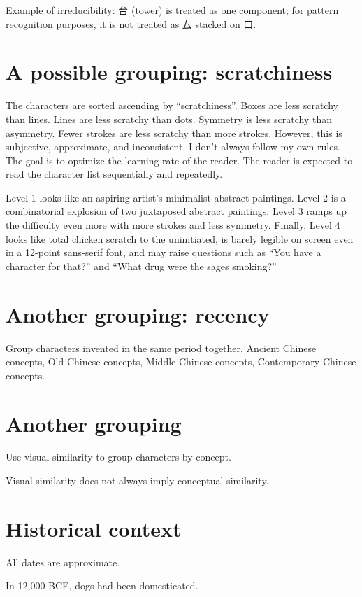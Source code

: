 Example of irreducibility:
台 (tower) is treated as one component;
for pattern recognition purposes,
it is not treated as 厶 stacked on 口.

\section{A possible grouping: scratchiness}

The characters are sorted ascending by ``scratchiness''.
Boxes are less scratchy than lines.
Lines are less scratchy than dots.
Symmetry is less scratchy than asymmetry.
Fewer strokes are less scratchy than more strokes.
However, this is subjective, approximate, and inconsistent.
I don't always follow my own rules.
The goal is to optimize the learning rate of the reader.
The reader is expected to read the character list
sequentially and repeatedly.

Level 1 looks like
an aspiring artist's minimalist abstract paintings.
Level 2 is a combinatorial explosion
of two juxtaposed abstract paintings.
Level 3 ramps up the difficulty even more with more strokes and less symmetry.
Finally, Level 4 looks like total chicken scratch to the uninitiated,
is barely legible on screen even in a 12-point sans-serif font,
and may raise questions such as
``You have a character for that?''
and
``What drug were the sages smoking?''

\section{Another grouping: recency}

Group characters invented in the same period together.
Ancient Chinese concepts,
Old Chinese concepts,
Middle Chinese concepts,
Contemporary Chinese concepts.

\section{Another grouping}

Use visual similarity to group characters by concept.

Visual similarity does not always imply conceptual similarity.

\section{Historical context}

All dates are approximate.

In 12,000 BCE, dogs had been domesticated.

